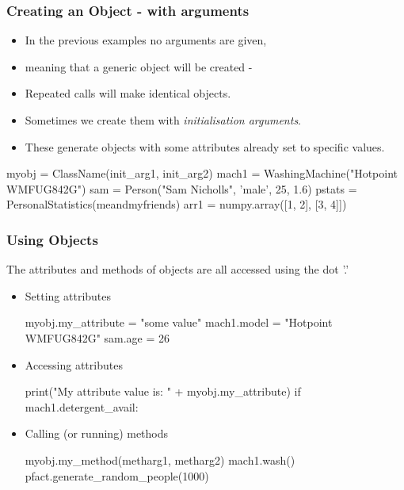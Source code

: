 \documentclass{beamer}
\begin{document}
\begin{frame}[fragile]
\frametitle{Creating an Object - with arguments}

\begin{itemize}
\item In the previous examples no arguments are given,
\item meaning that a generic object will be created -
\item Repeated calls will make identical objects.
\pause
\item Sometimes we create them with \emph{initialisation arguments}.
\item These generate objects with some attributes already set to specific values.
\end{itemize}

\begin{code}
myobj = ClassName(init_arg1, init_arg2)
mach1 = WashingMachine("Hotpoint WMFUG842G")
sam = Person("Sam Nicholls", 'male', 25, 1.6)
pstats = PersonalStatistics(meandmyfriends)
arr1 = numpy.array([1, 2], [3, 4]])
\end{code}
\end{frame}

\begin{frame}[fragile]
\frametitle{Using Objects}
The attributes and methods of objects are all accessed using the dot '.'
\begin{itemize}
\item Setting attributes
\begin{code}
myobj.my_attribute = "some value"
mach1.model = "Hotpoint WMFUG842G"
sam.age = 26
\end{code}
\pause
\item Accessing attributes
\begin{code}
print("My attribute value is: " + myobj.my_attribute)
if mach1.detergent_avail:
\end{code}
\pause
\item Calling (or running) methods
\begin{code}
myobj.my_method(metharg1, metharg2)
mach1.wash()
pfact.generate_random_people(1000)
\end{code}
\end{itemize}
\end{frame}
\end{document}
